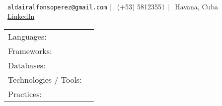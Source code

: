 \documentclass[]{awesome-cv}
\begin{document}

\begin{center}
  \\
  \vspace{2mm}
  {\faEnvelope\ \texttt{aldairalfonsoperez@gmail.com} |
   \faMobile\ (+53) 58123551 |
   \faMapMarker\ Havana, Cuba}\\
  \faLink\ \href{https://www.linkedin.com/in/aldair-alfonso-722b5421a/}{LinkedIn}
\end{center}


\begin{cventries}
	\cventry
	{}
	{\def\arraystretch{1.15}{\begin{tabular}{ l l }
				Languages:                            & {\skill{ C\# (Advanced), Python, C, C++, SQL, JavaScript.}}                       \\
				Frameworks:                           & {\skill{ .Net, ASP.NET, Django, FastAPI.}}                                        \\
				Databases:                            & {\skill{ MySQL, PostgreSQL, SQLite.}}                                             \\
				Technologies / Tools: \hspace{0.05cm} & {\skill{ Visual Studio, Unity Editor, Git, Docker, npm.}}                         \\
				Practices:                            & {\skill{ Agile, Scrum, SOLID Principles, Test-Driven Development, Code Reviews.}} \\
			\end{tabular}}}
	{}
	{}
	{}
\end{cventries}
\vspace{-7mm}
\end{document}
